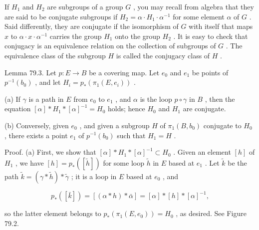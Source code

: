 If \({H}_{1}\) and \({H}_{2}\) are subgroups of a group \(G\) , you may recall from algebra that they are said to be conjugate subgroups if \({H}_{2} = \alpha  \cdot  {H}_{1} \cdot  {\alpha }^{-1}\) for some element \(\alpha\) of \(G\) . Said differently, they are conjugate if the isomorphism of \(G\) with itself that maps \(x\) to \(\alpha  \cdot  x \cdot  {\alpha }^{-1}\) carries the group \({H}_{1}\) onto the group \({H}_{2}\) . It is easy to check that conjugacy is an equivalence relation on the collection of subgroups of \(G\) . The equivalence class of the subgroup \(H\) is called the conjugacy class of \(H\) .

Lemma 79.3. Let \(p : E \rightarrow  B\) be a covering map. Let \({e}_{0}\) and \({e}_{1}\) be points of \({p}^{-1}\left( {b}_{0}\right)\) , and let \({H}_{i} = {p}_{ * }\left( {{\pi }_{1}\left( {E,{e}_{i}}\right) }\right)\) .

(a) If \(\gamma\) is a path in \(E\) from \({e}_{0}\) to \({e}_{1}\) , and \(\alpha\) is the loop \(p \circ  \gamma\) in \(B\) , then the equation \(\left\lbrack  \alpha \right\rbrack   * {H}_{1} * {\left\lbrack  \alpha \right\rbrack  }^{-1} = {H}_{0}\) holds; hence \({H}_{0}\) and \({H}_{1}\) are conjugate.

(b) Conversely, given \({e}_{0}\) , and given a subgroup \(H\) of \({\pi }_{1}\left( {B,{b}_{0}}\right)\) conjugate to \({H}_{0}\) , there exists a point \({e}_{1}\) of \({p}^{-1}\left( {b}_{0}\right)\) such that \({H}_{1} = H\) .

Proof. (a) First, we show that \(\left\lbrack  \alpha \right\rbrack   * {H}_{1} * {\left\lbrack  \alpha \right\rbrack  }^{-1} \subset  {H}_{0}\) . Given an element \(\left\lbrack  h\right\rbrack\) of \({H}_{1}\) , we have \(\left\lbrack  h\right\rbrack   = {p}_{ * }\left( \left\lbrack  \widetilde{h}\right\rbrack  \right)\) for some loop \(\widetilde{h}\) in \(E\) based at \({e}_{1}\) . Let \(\widetilde{k}\) be the path \(\widetilde{k} = \left( {\gamma  * \widetilde{h}}\right)  * \widetilde{\gamma }\) ; it is a loop in \(E\) based at \({e}_{0}\) , and

\[
{p}_{ * }\left( \left\lbrack  \bar{k}\right\rbrack  \right)  = \left\lbrack  {\left( {\alpha  * h}\right)  * \bar{\alpha }}\right\rbrack   = \left\lbrack  \alpha \right\rbrack   * \left\lbrack  h\right\rbrack   * {\left\lbrack  \alpha \right\rbrack  }^{-1},
\]

so the latter element belongs to \({p}_{ * }\left( {{\pi }_{1}\left( {E,{e}_{0}}\right) }\right)  = {H}_{0}\) , as desired. See Figure 79.2.

